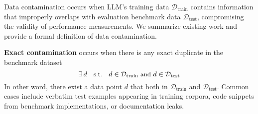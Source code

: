 





Data contamination occurs when LLM's training data \(\mathcal{D}_{\text{train}}\) contains information that improperly overlaps with evaluation benchmark data \(\mathcal{D}_{\text{test}}\), compromising the validity of performance measurements. We summarize existing work and provide a formal definition of data contamination.

\noindent \textbf{Exact contamination} occurs when there is any exact duplicate in the benchmark dataset 
\[
\small
\exists \, d \quad \text{s.t.} \quad d \in \mathcal{D}_{\text{train}} \text{ and } d \in \mathcal{D}_{\text{test}}
\]
In other word, there exist a data point $d$ that both in $\mathcal{D}_{\text{train}}$ and $\mathcal{D}_{\text{test}}$.
Common cases include verbatim test examples appearing in training corpora, code snippets from benchmark implementations, or documentation leaks.

